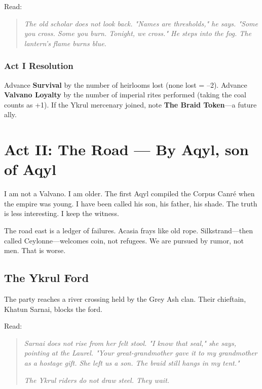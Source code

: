 \documentclass[11pt]{book}
\begin{document}
Read:
\begin{quote}
\emph{The old scholar does not look back. "Names are thresholds," he says. "Some you cross. Some you burn. Tonight, we cross." He steps into the fog. The lantern's flame burns blue.}
\end{quote}

\subsection*{Act I Resolution}
Advance \textbf{Survival} by the number of heirlooms lost (none lost = --2). Advance \textbf{Valvano Loyalty} by the number of imperial rites performed (taking the coal counts as +1). If the Ykrul mercenary joined, note \textbf{The Braid Token}---a future ally.

\clearpage

\chapter{Act II: The Road --- By Aqyl, son of Aqyl}

\lettrine{I}{} am not a Valvano. I am older. The first Aqyl compiled the Corpus Canr\'e when the empire was young. I have been called his son, his father, his shade. The truth is less interesting. I keep the witness.

The road east is a ledger of failures. Acasia frays like old rope. Silkstrand---then called Ceylonne---welcomes coin, not refugees. We are pursued by rumor, not men. That is worse.

\section*{The Ykrul Ford}
The party reaches a river crossing held by the Grey Ash clan. Their chieftain, Khatun Sarnai, blocks the ford.

Read:
\begin{quote}
\emph{Sarnai does not rise from her felt stool. "I know that seal," she says, pointing at the Laurel. "Your great-grandmother gave it to my grandmother as a hostage gift. She left us a son. The braid still hangs in my tent."}

\emph{The Ykrul riders do not draw steel. They wait.}
\end{quote}
\end{document}
